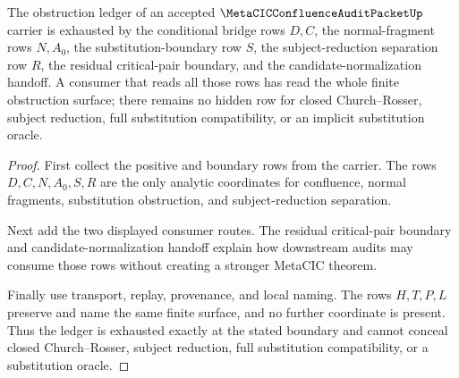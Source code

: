 \begin{theorem}
\label{thm:metacic-confluence-audit-obstruction-ledger-exhaustion}
The obstruction ledger of an accepted $\MetaCICConfluenceAuditPacketUp$ carrier is exhausted by the conditional bridge rows $D,C$, the normal-fragment rows $N,A_0$, the substitution-boundary row $S$, the subject-reduction separation row $R$, the residual critical-pair boundary, and the candidate-normalization handoff. A consumer that reads all those rows has read the whole finite obstruction surface; there remains no hidden row for closed Church--Rosser, subject reduction, full substitution compatibility, or an implicit substitution oracle.
\end{theorem}
\begin{proof}
First collect the positive and boundary rows from the carrier. The rows $D,C,N,A_0,S,R$ are the only analytic coordinates for confluence, normal fragments, substitution obstruction, and subject-reduction separation.

Next add the two displayed consumer routes. The residual critical-pair boundary and candidate-normalization handoff explain how downstream audits may consume those rows without creating a stronger MetaCIC theorem.

Finally use transport, replay, provenance, and local naming. The rows $H,T,P,L$ preserve and name the same finite surface, and no further coordinate is present. Thus the ledger is exhausted exactly at the stated boundary and cannot conceal closed Church--Rosser, subject reduction, full substitution compatibility, or a substitution oracle.
\end{proof}

